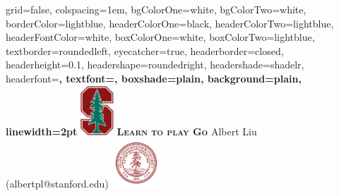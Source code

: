 \documentclass[landscape,a0paper,fontscale=0.285]{baposter}
\begin{document}


\begin{poster}%
  {
  grid=false,
  colspacing=1em,
  bgColorOne=white,
  bgColorTwo=white,
  borderColor=lightblue,
  headerColorOne=black,
  headerColorTwo=lightblue,
  headerFontColor=white,
  boxColorOne=white,
  boxColorTwo=lightblue,
  textborder=roundedleft,
  eyecatcher=true,
  headerborder=closed,
  headerheight=0.1\textheight,
  headershape=roundedright,
  headershade=shadelr,
  headerfont=\Large\bf\textsc, %
  textfont={\setlength{\parindent}{1.5em}},
  boxshade=plain,
  background=plain,
  linewidth=2pt
  }
  {\includegraphics[height=5em]{SU_New_BlockStree_2color}}
  {\bf\textsc{Learn to play Go}\vspace{0.5em}}
  {{Albert Liu (albertpl@stanford.edu})}
  {%
    \includegraphics[height=5.0em]{SU_Seal_Red}
  }

    \newcommand{\colouredcircle}{%
      \tikz{\useasboundingbox (-0.2em,-0.32em) rectangle(0.2em,0.32em);
            \draw[draw=black,fill=lightblue,line width=0.03em] (0,0) circle(0.18em);
      }
    }



\end{poster}
\end{document}
